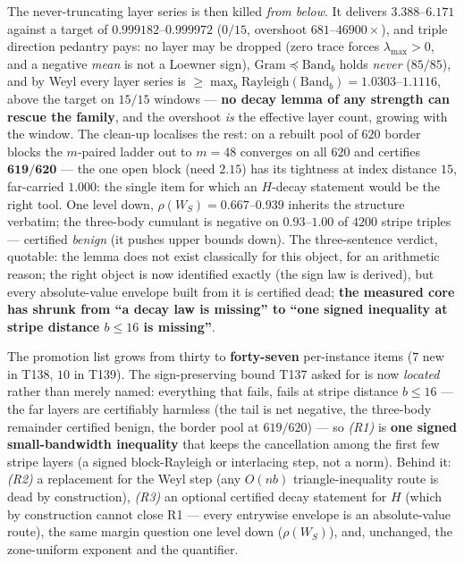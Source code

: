 \documentclass[11pt,a4paper]{article}
\begin{document}
The never-truncating layer series is then killed \emph{from below}. It delivers $3.388$--$6.171$
against a target of $0.999182$--$0.999972$ ($0/15$, overshoot $681$--$46900\times$), and triple
direction pedantry pays: no layer may be dropped (zero trace forces $\lambda_{\max}>0$, and a
negative \emph{mean} is not a Loewner sign), $\mathrm{Gram}\preceq\mathrm{Band}_b$ holds \emph{never}
($85/85$), and by Weyl every layer series is
$\ge\max_b\mathrm{Rayleigh}(\mathrm{Band}_b)=1.0303$--$1.1116$, above the target on $15/15$ windows
--- \textbf{no decay lemma of any strength can rescue the family}, and the overshoot \emph{is} the
effective layer count, growing with the window. The clean-up localises the rest: on a rebuilt pool of
$620$ border blocks the $m$-paired ladder out to $m=48$ converges on all $620$ and certifies
$\mathbf{619/620}$ --- the one open block (need $2.15$) has its tightness at index distance $15$,
far-carried $1.000$: the single item for which an $H$-decay statement would be the right tool. One
level down, $\rho(W_S)=0.667$--$0.939$ inherits the structure verbatim; the three-body cumulant is
negative on $0.93$--$1.00$ of $4200$ stripe triples --- certified \emph{benign} (it pushes upper
bounds down). The three-sentence verdict, quotable: the lemma does not exist classically for this
object, for an arithmetic reason; the right object is now identified exactly (the sign law is
derived), but every absolute-value envelope built from it is certified dead; \textbf{the measured
core has shrunk from ``a decay law is missing'' to ``one signed inequality at stripe distance
$b\le16$ is missing''}.

\begin{keybox}
The promotion list grows from thirty to \textbf{forty-seven} per-instance items ($7$ new in T138,
$10$ in T139). The sign-preserving bound T137 asked for is now \emph{located} rather than merely
named: everything that fails, fails at stripe distance $b\le16$ --- the far layers are certifiably
harmless (the tail is net negative, the three-body remainder certified benign, the border pool at
$619/620$) --- so \emph{(R1)} is \textbf{one signed small-bandwidth inequality} that keeps the
cancellation among the first few stripe layers (a signed block-Rayleigh or interlacing step, not a
norm). Behind it: \emph{(R2)} a replacement for the Weyl step (any $O(nb)$ triangle-inequality route
is dead by construction), \emph{(R3)} an optional certified decay statement for $H$ (which by
construction cannot close R1 --- every entrywise envelope is an absolute-value route), the same
margin question one level down ($\rho(W_S)$), and, unchanged, the zone-uniform exponent and the
quantifier.
\end{keybox}
\end{document}
